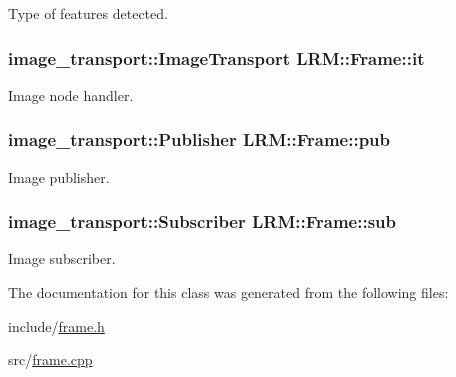 \-Type of features detected. 

\hypertarget{classLRM_1_1Frame_a9a85162296d550daca6fcf0e39a34f5a}{
\subsubsection[{it}]{\setlength{\rightskip}{0pt plus 5cm}image\-\_\-transport\-::\-Image\-Transport {\bf \-L\-R\-M\-::\-Frame\-::it}}}\label{classLRM_1_1Frame_a9a85162296d550daca6fcf0e39a34f5a}


\-Image node handler. 

\hypertarget{classLRM_1_1Frame_a70a2be50521677bd21c4853ce2ccb0f4}{
\subsubsection[{pub}]{\setlength{\rightskip}{0pt plus 5cm}image\-\_\-transport\-::\-Publisher {\bf \-L\-R\-M\-::\-Frame\-::pub}}}\label{classLRM_1_1Frame_a70a2be50521677bd21c4853ce2ccb0f4}


\-Image publisher. 

\hypertarget{classLRM_1_1Frame_afde5ec8c81b21aa924f5b054b31e055a}{
\subsubsection[{sub}]{\setlength{\rightskip}{0pt plus 5cm}image\-\_\-transport\-::\-Subscriber {\bf \-L\-R\-M\-::\-Frame\-::sub}}}\label{classLRM_1_1Frame_afde5ec8c81b21aa924f5b054b31e055a}


\-Image subscriber. 



\-The documentation for this class was generated from the following files\-:\begin{DoxyCompactItemize}
\item 
include/\hyperlink{frame_8h}{frame.\-h}\item 
src/\hyperlink{frame_8cpp}{frame.\-cpp}\end{DoxyCompactItemize}
